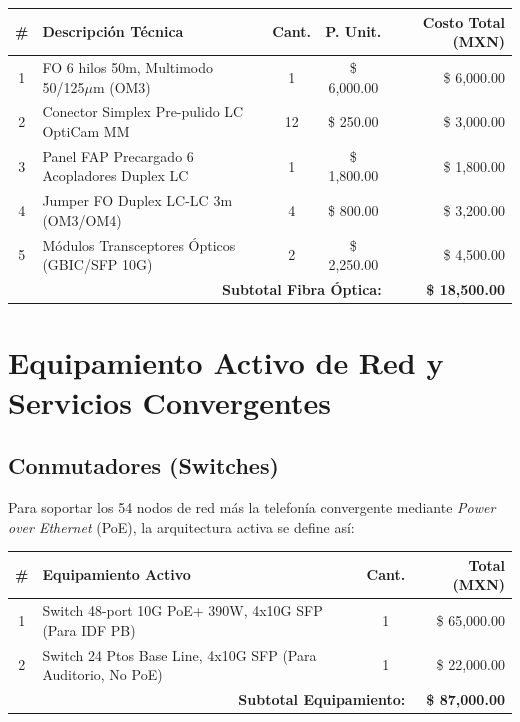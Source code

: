 \documentclass[11pt, letterpaper]{article}
\begin{document}
\begin{table}[h]
\centering
{}
\renewcommand{\arraystretch}{1.3}
\begin{tabularx}{\textwidth}{@{} c X c c r @{}}
\toprule
\rowcolor{AzulUNAM!10}
\textbf{\#} & \textbf{Descripción Técnica} & \textbf{Cant.} & \textbf{P. Unit.} & \textbf{Costo Total (MXN)} \\ \midrule
1 & FO 6 hilos 50m, Multimodo 50/125$\mu$m (OM3) & 1 & \$ 6,000.00 & \$ 6,000.00 \\
2 & Conector Simplex Pre-pulido LC OptiCam MM & 12 & \$ 250.00 & \$ 3,000.00 \\
3 & Panel FAP Precargado 6 Acopladores Duplex LC & 1 & \$ 1,800.00 & \$ 1,800.00 \\
4 & Jumper FO Duplex LC-LC 3m (OM3/OM4) & 4 & \$ 800.00 & \$ 3,200.00 \\
5 & Módulos Transceptores Ópticos (GBIC/SFP 10G) & 2 & \$ 2,250.00 & \$ 4,500.00 \\ \midrule
\multicolumn{4}{r}{\textbf{Subtotal Fibra Óptica:}} & \textbf{\textcolor{AzulUNAM}{\$ 18,500.00}} \\
\bottomrule
\end{tabularx}
\end{table}

\section{Equipamiento Activo de Red y Servicios Convergentes}

\subsection{Conmutadores (Switches)}
Para soportar los 54 nodos de red más la telefonía convergente mediante \textit{Power over Ethernet} (PoE), la arquitectura activa se define así:

\begin{table}[h]
\centering
{}
\renewcommand{\arraystretch}{1.3}
\begin{tabularx}{\textwidth}{@{} c X c r @{}}
\toprule
\rowcolor{AzulUNAM!10}
\textbf{\#} & \textbf{Equipamiento Activo} & \textbf{Cant.} & \textbf{Total (MXN)} \\ \midrule
1 & Switch 48-port 10G PoE+ 390W, 4x10G SFP (Para IDF PB) & 1 & \$ 65,000.00 \\
2 & Switch 24 Ptos Base Line, 4x10G SFP (Para Auditorio, No PoE) & 1 & \$ 22,000.00 \\ \midrule
\multicolumn{3}{r}{\textbf{Subtotal Equipamiento:}} & \textbf{\textcolor{AzulUNAM}{\$ 87,000.00}} \\
\bottomrule
\end{tabularx}
\end{table}
\end{document}
